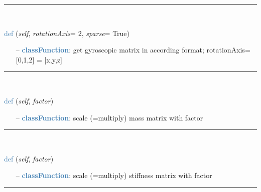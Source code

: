 \begin{itemize}[leftmargin=1.4cm]
\begin{itemize}[leftmargin=1.4cm]
\begin{itemize}[leftmargin=1.4cm]
\begin{itemize}[leftmargin=0.5cm]
\begin{itemize}[leftmargin=1.4cm]
\begin{itemize}[leftmargin=1.4cm]
\begin{itemize}[leftmargin=0.5cm]
%
\noindent\rule{8cm}{0.75pt}\vspace{1pt} \\ 
\begin{flushleft}
\noindent \textcolor{steelblue}{def {\bf {}}}\label{sec:FEM:FEMinterface:GetGyroscopicMatrix}
({\it self}, {\it rotationAxis}= 2, {\it sparse}= True)
\end{flushleft}
\setlength{\itemindent}{0.7cm}
\begin{itemize}[leftmargin=0.7cm]
\item[--]\textcolor{steelblue}{\bf classFunction}: get gyroscopic matrix in according format; rotationAxis=[0,1,2] = [x,y,z]
\vspace{12pt}\end{itemize}
%
\noindent\rule{8cm}{0.75pt}\vspace{1pt} \\ 
\begin{flushleft}
\noindent \textcolor{steelblue}{def {\bf {}}}\label{sec:FEM:FEMinterface:ScaleMassMatrix}
({\it self}, {\it factor})
\end{flushleft}
\setlength{\itemindent}{0.7cm}
\begin{itemize}[leftmargin=0.7cm]
\item[--]\textcolor{steelblue}{\bf classFunction}: scale (=multiply) mass matrix with factor
\vspace{12pt}\end{itemize}
%
\noindent\rule{8cm}{0.75pt}\vspace{1pt} \\ 
\begin{flushleft}
\noindent \textcolor{steelblue}{def {\bf {}}}\label{sec:FEM:FEMinterface:ScaleStiffnessMatrix}
({\it self}, {\it factor})
\end{flushleft}
\setlength{\itemindent}{0.7cm}
\begin{itemize}[leftmargin=0.7cm]
\item[--]\textcolor{steelblue}{\bf classFunction}: scale (=multiply) stiffness matrix with factor
\vspace{12pt}\end{itemize}
%
\noindent\rule{8cm}{0.75pt}\vspace{1pt} \\ 

\end{itemize}
\end{itemize}
\end{itemize}
\end{itemize}
\end{itemize}
\end{itemize}
\end{itemize}
